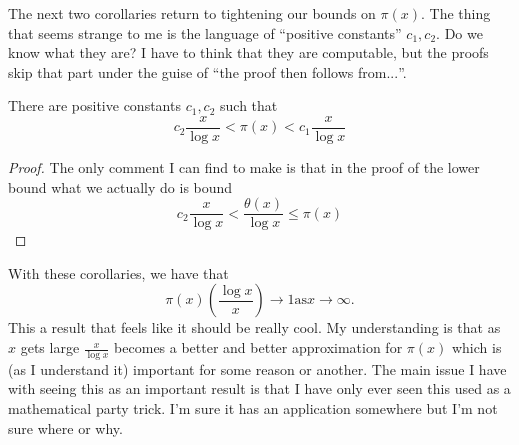 The next two corollaries return to tightening our bounds on \(\pi(x)\). The
thing that seems strange to me is the language of ``positive constants''
\(c_1,c_2\). Do we know what they are? I have to think that they are computable,
but the proofs skip that part under the guise of ``the proof then follows from\(...\)''.

\begin{corollary}
  There are positive constants \(c_1,c_2\) such that
  \[
    c_2 \frac{x}{\log x} < \pi(x) < c_1 \frac{x}{\log x}
  \]
\end{corollary}

\begin{proof}
  The only comment I can find to make is that in the proof of the lower bound
  what we actually do is bound
  \[
    c_2 \frac{x}{\log x} < \frac{\theta(x)}{\log x} \leq \pi(x)
  \]
\end{proof}

With these corollaries, we have that
\[
  \pi(x) \left( \frac{\log x}{x} \right) \to 1 \text{as} x \to \infty.
\]
This a result that feels like it should be really cool. My understanding is that
as \(x\) gets large \(\frac{x}{\log x}\) becomes a better and better
approximation for \(\pi(x)\) which is (as I understand it) important for some
reason or another. The main issue I have with seeing this as an important
result is that I have only ever seen this used as a mathematical party trick.
I'm sure it has an application somewhere but I'm not sure where or why.
